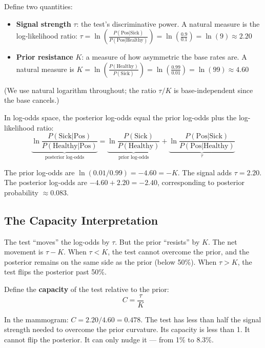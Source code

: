 \documentclass[12pt]{article}
\begin{document}
Define two quantities:
\begin{itemize}[nosep]
\item \textbf{Signal strength} $\tau$: the test's discriminative power. A natural measure is the log-likelihood ratio: $\tau = \ln\left(\frac{P(\text{Pos}|\text{Sick})}{P(\text{Pos}|\text{Healthy})}\right) = \ln\left(\frac{0.9}{0.1}\right) = \ln(9) \approx 2.20$
\item \textbf{Prior resistance} $K$: a measure of how asymmetric the base rates are. A natural measure is $K = \ln\left(\frac{P(\text{Healthy})}{P(\text{Sick})}\right) = \ln\left(\frac{0.99}{0.01}\right) = \ln(99) \approx 4.60$
\end{itemize}

(We use natural logarithm throughout; the ratio $\tau/K$ is base-independent since the base cancels.)

In log-odds space, the posterior log-odds equal the prior log-odds plus the log-likelihood ratio:
\begin{equation}
\underbrace{\ln \frac{P(\text{Sick}|\text{Pos})}{P(\text{Healthy}|\text{Pos})}}_{\text{posterior log-odds}} = \underbrace{\ln \frac{P(\text{Sick})}{P(\text{Healthy})}}_{\text{prior log-odds}} + \underbrace{\ln \frac{P(\text{Pos}|\text{Sick})}{P(\text{Pos}|\text{Healthy})}}_{\tau}
\end{equation}

The prior log-odds are $\ln(0.01/0.99) = -4.60 = -K$. The signal adds $\tau = 2.20$. The posterior log-odds are $-4.60 + 2.20 = -2.40$, corresponding to posterior probability $\approx 0.083$.

\subsection{The Capacity Interpretation}

The test ``moves'' the log-odds by $\tau$. But the prior ``resists'' by $K$. The net movement is $\tau - K$. When $\tau < K$, the test cannot overcome the prior, and the posterior remains on the same side as the prior (below 50\%). When $\tau > K$, the test flips the posterior past 50\%.

Define the \textbf{capacity} of the test relative to the prior:
\begin{equation}
C = \frac{\tau}{K}
\end{equation}

In the mammogram: $C = 2.20 / 4.60 = 0.478$. The test has less than half the signal strength needed to overcome the prior curvature. Its capacity is less than 1. It cannot flip the posterior. It can only nudge it --- from 1\% to 8.3\%.
\end{document}
